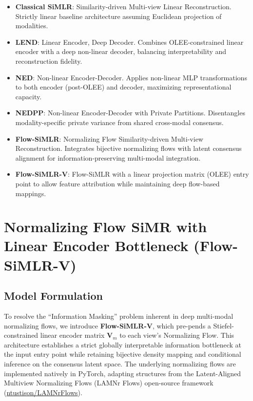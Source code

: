 \documentclass[
  letterpaper,
]{report}
\begin{document}
\begin{itemize}
  \textbf{Spectral Sharpness}: A random-matrix-theory-based metric
  evaluating singular value concentrations to identify and suppress
  isotropic high-dimensional noise, preventing it from corrupting the
  consensus representation.
\item
  \textbf{Classical SiMLR}: Similarity-driven Multi-view Linear
  Reconstruction. Strictly linear baseline architecture assuming
  Euclidean projection of modalities.
\item
  \textbf{LEND}: Linear Encoder, Deep Decoder. Combines OLEE-constrained
  linear encoder with a deep non-linear decoder, balancing
  interpretability and reconstruction fidelity.
\item
  \textbf{NED}: Non-linear Encoder-Decoder. Applies non-linear MLP
  transformations to both encoder (post-OLEE) and decoder, maximizing
  representational capacity.
\item
  \textbf{NEDPP}: Non-linear Encoder-Decoder with Private Partitions.
  Disentangles modality-specific private variance from shared
  cross-modal consensus.
\item
  \textbf{Flow-SiMLR}: Normalizing Flow Similarity-driven Multi-view
  Reconstruction. Integrates bijective normalizing flows with latent
  consensus alignment for information-preserving multi-modal
  integration.
\item
  \textbf{Flow-SiMLR-V}: Flow-SiMLR with a linear projection matrix
  (OLEE) entry point to allow feature attribution while maintaining deep
  flow-based mappings.
\end{itemize}

\chapter{Normalizing Flow SiMR with Linear Encoder Bottleneck
(Flow-SiMLR-V)}\label{normalizing-flow-simr-with-linear-encoder-bottleneck-flow-simlr-v}

\section{Model Formulation}\label{model-formulation}

To resolve the ``Information Masking'' problem inherent in deep
multi-modal normalizing flows, we introduce \textbf{Flow-SiMLR-V}, which
pre-pends a Stiefel-constrained linear encoder matrix \(\mathbf{V}_m\)
to each view's Normalizing Flow. This architecture establishes a strict
globally interpretable information bottleneck at the input entry point
while retaining bijective density mapping and conditional inference on
the consensus latent space. The underlying normalizing flows are
implemented natively in PyTorch, adapting structures from the
Latent-Aligned Multiview Normalizing Flows (LAMNr Flows) open-source
framework
(\href{https://github.com/ntustison/LAMNrFlows}{ntustison/LAMNrFlows}).
\end{document}

